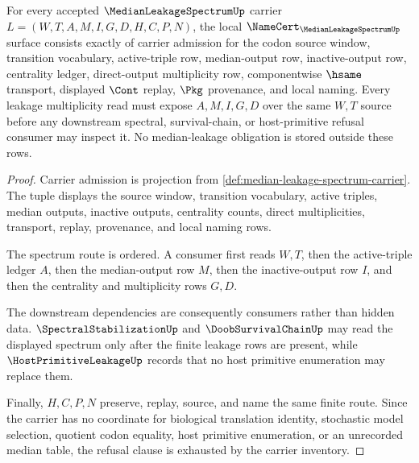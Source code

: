 \begin{theorem}\label{thm:median-leakage-spectrum-namecert-obligations}
For every accepted $\MedianLeakageSpectrumUp$ carrier $L=(W,T,A,M,I,G,D,H,C,P,N)$, the local $\NameCert_{\MedianLeakageSpectrumUp}$ surface consists exactly of carrier admission for the codon source window, transition vocabulary, active-triple row, median-output row, inactive-output row, centrality ledger, direct-output multiplicity row, componentwise $\hsame$ transport, displayed $\Cont$ replay, $\Pkg$ provenance, and local naming. Every leakage multiplicity read must expose $A,M,I,G,D$ over the same $W,T$ source before any downstream spectral, survival-chain, or host-primitive refusal consumer may inspect it. No median-leakage obligation is stored outside these rows.
\end{theorem}
\begin{proof}
Carrier admission is projection from \autoref{def:median-leakage-spectrum-carrier}. The tuple displays the source window, transition vocabulary, active triples, median outputs, inactive outputs, centrality counts, direct multiplicities, transport, replay, provenance, and local naming rows.

The spectrum route is ordered. A consumer first reads $W,T$, then the active-triple ledger $A$, then the median-output row $M$, then the inactive-output row $I$, and then the centrality and multiplicity rows $G,D$.

The downstream dependencies are consequently consumers rather than hidden data. $\SpectralStabilizationUp$ and $\DoobSurvivalChainUp$ may read the displayed spectrum only after the finite leakage rows are present, while $\HostPrimitiveLeakageUp$ records that no host primitive enumeration may replace them.

Finally, $H,C,P,N$ preserve, replay, source, and name the same finite route. Since the carrier has no coordinate for biological translation identity, stochastic model selection, quotient codon equality, host primitive enumeration, or an unrecorded median table, the refusal clause is exhausted by the carrier inventory.
\end{proof}


